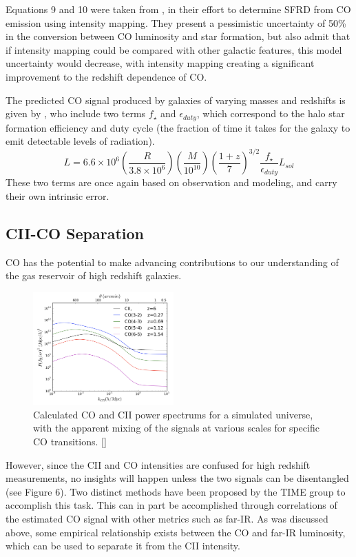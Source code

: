 \documentclass[manuscript]{aastex}
\begin{document}
Equations 9 and 10 were taken from \cite{Breysse2016}, in their effort to determine SFRD from CO emission using intensity mapping.  They present a pessimistic uncertainty of 50\% in the conversion between CO luminosity and star formation, but also admit that if intensity mapping could be compared with other galactic features, this model uncertainty would decrease, with intensity mapping creating a significant improvement to the redshift dependence of CO.  

The predicted CO signal produced by galaxies of varying masses and redshifts is given by \cite{Visbal2010}, who include two terms  $f_{\star}$ and $\epsilon_{duty}$, which correspond to the halo star formation efficiency and 
duty cycle (the fraction of time it takes for the galaxy to emit detectable levels of radiation). 
\begin{equation}
L = 6.6\times10^{6}(\frac{R}{3.8\times10^{6}})(\frac{M}{10^{10}})(\frac{1+z}{7})^{3/2} \frac{f_{\star}}{\epsilon_{duty}} L_{sol}
\end{equation}
These two terms are once again based on observation and modeling, and carry their own intrinsic error. 

\subsection{CII-CO Separation}
CO has the potential to make advancing contributions to our understanding of the gas reservoir of high redshift galaxies. 
\begin{figure}
\vspace{-0.8cm}
  \begin{center}
    \includegraphics[width=0.48\textwidth]{cheng1.png}
  \end{center}
  \caption[Calculated CO and CII power spectrums, showing the difficulty in separating the two signals. -(\cite{Cheng2016})]{Calculated CO and CII power spectrums for a simulated universe, with the apparent mixing of the signals at various scales for specific CO transitions. [\cite{Cheng2016}]}
\end{figure}
However, since the CII and CO intensities are confused for high redshift measurements, no insights will happen unless the two signals can be disentangled (see Figure 6). Two distinct methods have been proposed by the TIME group to accomplish this task. This can in part be accomplished through correlations of the estimated CO signal with other metrics such as far-IR. As was discussed above, some empirical relationship exists between the CO and far-IR luminosity, which can be used to separate it from the CII intensity.  
\end{document}
